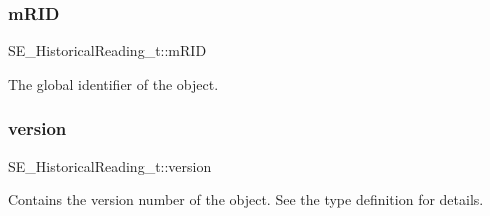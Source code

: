 \subsubsection{\texorpdfstring{m\+R\+ID}{mRID}}
{\footnotesize\ttfamily S\+E\+\_\+\+Historical\+Reading\+\_\+t\+::m\+R\+ID}

The global identifier of the object. \mbox{\label{group__HistoricalReading_ga150122578c7309243a68cfc321322f7f}} 
\subsubsection{\texorpdfstring{version}{version}}
{\footnotesize\ttfamily S\+E\+\_\+\+Historical\+Reading\+\_\+t\+::version}

Contains the version number of the object. See the type definition for details. 